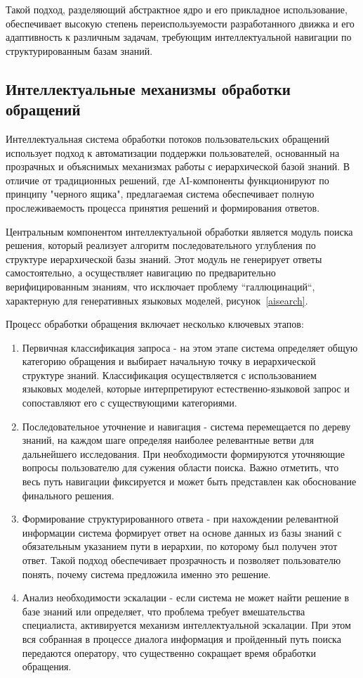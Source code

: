Такой подход, разделяющий абстрактное ядро и его прикладное использование, обеспечивает высокую степень переиспользуемости разработанного движка и его адаптивность к различным задачам, требующим интеллектуальной навигации по структурированным базам знаний.

\subsection{Интеллектуальные механизмы обработки обращений}

Интеллектуальная система обработки потоков пользовательских обращений использует подход к автоматизации поддержки пользователей, основанный на прозрачных и объяснимых механизмах работы с иерархической базой знаний. В отличие от традиционных решений, где AI-компоненты функционируют по принципу "черного ящика", предлагаемая система обеспечивает полную прослеживаемость процесса принятия решений и формирования ответов.

Центральным компонентом интеллектуальной обработки является модуль поиска решения, который реализует алгоритм последовательного углубления по структуре иерархической базы знаний. Этот модуль не генерирует ответы самостоятельно, а осуществляет навигацию по предварительно верифицированным знаниям, что исключает проблему ``галлюцинаций``, характерную для генеративных языковых моделей, рисунок~\ref{aisearch}.


Процесс обработки обращения включает несколько ключевых этапов:
\begin{enumerate}[label=\arabic*.]
    \item Первичная классификация запроса - на этом этапе система определяет общую категорию обращения и выбирает начальную точку в иерархической структуре знаний. Классификация осуществляется с использованием языковых моделей, которые интерпретируют естественно-языковой запрос и сопоставляют его с существующими категориями.
    \item Последовательное уточнение и навигация - система перемещается по дереву знаний, на каждом шаге определяя наиболее релевантные ветви для дальнейшего исследования. При необходимости формируются уточняющие вопросы пользователю для сужения области поиска. Важно отметить, что весь путь навигации фиксируется и может быть представлен как обоснование финального решения.
    \item Формирование структурированного ответа - при нахождении релевантной информации система формирует ответ на основе данных из базы знаний с обязательным указанием пути в иерархии, по которому был получен этот ответ. Такой подход обеспечивает прозрачность и позволяет пользователю понять, почему система предложила именно это решение.
    \item Анализ необходимости эскалации - если система не может найти решение в базе знаний или определяет, что проблема требует вмешательства специалиста, активируется механизм интеллектуальной эскалации. При этом вся собранная в процессе диалога информация и пройденный путь поиска передаются оператору, что существенно сокращает время обработки обращения.
\end{enumerate}

